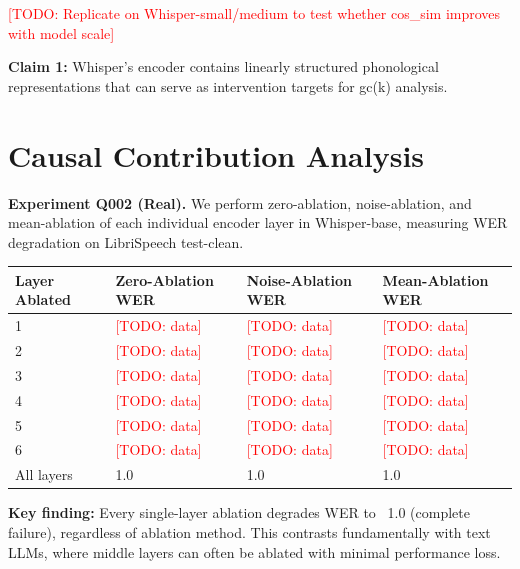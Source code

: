 \documentclass[a4paper]{article}
\begin{document}
\textcolor{red}{[TODO: Replicate on Whisper-small/medium to test whether cos_sim improves with model scale]}

\textbf{Claim 1:} Whisper's encoder contains linearly structured phonological representations that can serve as intervention targets for gc(k) analysis.


\section{Causal Contribution Analysis}

\textbf{Experiment Q002 (Real).} We perform zero-ablation, noise-ablation, and mean-ablation of each individual encoder layer in Whisper-base, measuring WER degradation on LibriSpeech test-clean.

\begin{table}[htbp]
\centering
\begin{tabular}{llll}
\toprule
Layer Ablated & Zero-Ablation WER & Noise-Ablation WER & Mean-Ablation WER \\
\midrule
1 & \textcolor{red}{[TODO: data]} & \textcolor{red}{[TODO: data]} & \textcolor{red}{[TODO: data]} \\
2 & \textcolor{red}{[TODO: data]} & \textcolor{red}{[TODO: data]} & \textcolor{red}{[TODO: data]} \\
3 & \textcolor{red}{[TODO: data]} & \textcolor{red}{[TODO: data]} & \textcolor{red}{[TODO: data]} \\
4 & \textcolor{red}{[TODO: data]} & \textcolor{red}{[TODO: data]} & \textcolor{red}{[TODO: data]} \\
5 & \textcolor{red}{[TODO: data]} & \textcolor{red}{[TODO: data]} & \textcolor{red}{[TODO: data]} \\
6 & \textcolor{red}{[TODO: data]} & \textcolor{red}{[TODO: data]} & \textcolor{red}{[TODO: data]} \\
All layers & 1.0 & 1.0 & 1.0 \\
\bottomrule
\end{tabular}
\end{table}

\textbf{Key finding:} Every single-layer ablation degrades WER to ~1.0 (complete failure), regardless of ablation method. This contrasts fundamentally with text LLMs, where middle layers can often be ablated with minimal performance loss.
\end{document}
